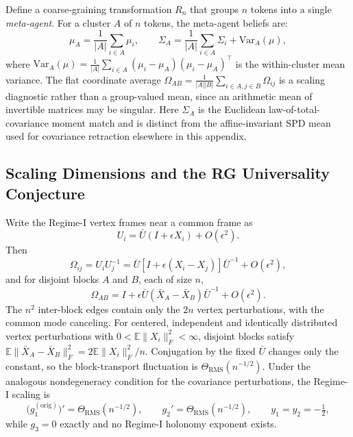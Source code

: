 \documentclass[twoside,11pt]{article}
\begin{document}
Define a coarse-graining transformation $R_n$ that groups $n$ tokens into a single \emph{meta-agent}. For a cluster $A$ of $n$ tokens, the meta-agent beliefs are:
\begin{equation}
\mu_A = \frac{1}{|A|} \sum_{i \in A} \mu_i, \qquad
\Sigma_A = \frac{1}{|A|} \sum_{i \in A} \Sigma_i + \mathrm{Var}_A(\mu),
\label{eq:meta_agent_beliefs_supp}
\end{equation}
where $\mathrm{Var}_A(\mu) = \frac{1}{|A|} \sum_{i \in A} (\mu_i - \mu_A)(\mu_i - \mu_A)^\top$ is the within-cluster mean variance. The flat coordinate average $\Omega_{AB}=\frac{1}{|A||B|}\sum_{i\in A,j\in B}\Omega_{ij}$ is a scaling diagnostic rather than a group-valued mean, since an arithmetic mean of invertible matrices may be singular. Here $\Sigma_A$ is the Euclidean law-of-total-covariance moment match and is distinct from the affine-invariant SPD mean used for covariance retraction elsewhere in this appendix.

\subsection{Scaling Dimensions and the RG Universality Conjecture}

Write the Regime-I vertex frames near a common frame as
\begin{equation}
U_i=\bar U(I+\epsilon X_i)+O(\epsilon^2).
\end{equation}
Then
\begin{equation}
\Omega_{ij}=U_iU_j^{-1}
=\bar U\left[I+\epsilon(X_i-X_j)\right]\bar U^{-1}+O(\epsilon^2),
\end{equation}
and for disjoint blocks $A$ and $B$, each of size $n$,
\begin{equation}
\Omega_{AB}=I+\epsilon\bar U(\bar X_A-\bar X_B)\bar U^{-1}+O(\epsilon^2).
\end{equation}
The $n^2$ inter-block edges contain only the $2n$ vertex perturbations, with the common mode canceling. For centered, independent and identically distributed vertex perturbations with $0<\mathbb{E}\|X_i\|_F^2<\infty$, disjoint blocks satisfy $\mathbb{E}\|\bar X_A-\bar X_B\|_F^2=2\mathbb{E}\|X_i\|_F^2/n$. Conjugation by the fixed $\bar U$ changes only the constant, so the block-transport fluctuation is $\Theta_{\mathrm{RMS}}(n^{-1/2})$. Under the analogous nondegeneracy condition for the covariance perturbations, the Regime-I scaling is
\begin{equation}
\bigl(g_1^{(\mathrm{orig})}\bigr)'=\Theta_{\mathrm{RMS}}(n^{-1/2}),
\qquad
g_2'=\Theta_{\mathrm{RMS}}(n^{-1/2}),
\qquad
y_1=y_2=-\tfrac{1}{2},
\label{eq:rg_scaling_supp}
\end{equation}
while $g_3=0$ exactly and no Regime-I holonomy exponent exists.
\end{document}
